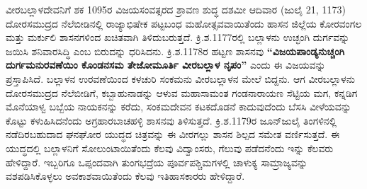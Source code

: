 ವೀರಬಲ್ಲಾಳದೇವನಿಗೆ ಶಕ 1095ರ ವಿಜಯಸಂವತ್ಸರದ ಶ್ರಾವಣ ಶುದ್ಧ ದಶಮೀ ಆದಿವಾರ (ಜುಲೈ 21, 1173) ದೋರಸಮುದ್ರದ ನೆಲೆಬೀಡಿನಲ್ಲಿ ರಾಜ್ಯಾಭಿಷೇಕ ಪಟ್ಟಬಂಧ ಮಹೋತ್ಸವವಾಯಿತೆಂದು ಹಾಸನ ಜಿಲ್ಲೆಯ ಕೋರವಂಗಲ ಮತ್ತು ಮರ್ಕುಲಿ ಶಾಸನಗಳಿಂದ ಖಚಿತವಾಗಿ ತಿಳಿದುಬರುತ್ತದೆ. ಕ್ರಿ.ಶ.1177ರಲ್ಲಿ ಬಲ್ಲಾಳನು ಉಚ್ಛಂಗಿ ದುರ್ಗವನ್ನು ಜಯಿಸಿ ಶನಿವಾರಸಿದ್ಧಿ ಎಂಬ ಬಿರುದನ್ನು ಧರಿಸಿದನು. ಕ್ರಿ.ಶ.1178ರ ಹಟ್ಟಣ ಶಾಸನವು \textbf{“ವಿಜಯಪಾಂಡ್ಯನುಚ್ಚಂಗಿ ದುರ್ಗಮನುರವಣೆಯಿಂ ಕೊಂಡನಸಮ ತೇಜೋಮೂರ್ತಿ ವೀರಬಲ್ಲಾಳ ನೃಪಂ”} ಎಂದು ಈ ವಿಜಯವನ್ನು ಪ್ರಸ್ತಾಪಿಸಿದೆ. ಬಲ್ಲಾಳನ ಉರವಣೆಯಿಂದ ಕಳಚುರಿ ಸಂಕಮನು ವೀರಬಲ್ಲಾಳನ ಮೇಲೆ ಬಿದ್ದನು. ಆಗ ವೀರಬಲ್ಲಾಳನು ದೋರಸಮುದ್ರದ ನೆಲೆಬೀಡಿಗೆ, ಕಬ್ಬಾಹುನಾಡನ್ನು ಆಳುವ ಮಹಾಸಾಮಂತ ಗಂಡನಾರಾಯಣ ಸೆಟ್ಟಿಯ ಮಗ, ಕನ್ನಡಿಗ ಮೊನೆಯಾಳ್ವ ಬಬ್ಬೆಯ ನಾಯಕನನ್ನು ಕರೆದು, ಸಂಕಮದೇವನ ಕಟಕದೊಡನೆ ಕಾದುವುದೆಂದು ಬೆಸಸಿ ವೀಳೆಯವನ್ನು ಕೊಟ್ಟು ಕಳುಹಿಸಿದನೆಂದು ಅಗ್ರಹಾರಬಾಚಹಳ್ಳಿ ಶಾಸನವು ತಿಳಿಸುತ್ತದೆ. ಕ್ರಿ.ಶ.1179ರ ಜೂನ್​\enginline{-}ಜುಲೈ ತಿಂಗಳಿನಲ್ಲಿ ನಡೆದಿರಬಹುದಾದ ಘನಘೋರ ಯುದ್ಧದ ಚಿತ್ರವನ್ನು ಈ ವೀರಗಲ್ಲು ಶಾಸನ ಶಿಲ್ಪದ ಸಮೇತ ವರ್ಣಿಸುತ್ತದೆ. ಈ ಯುದ್ಧದಲ್ಲಿ ಬಲ್ಲಾಳನಿಗೆ ಸೋಲುಂಟಾಯಿ\-ತೆಂದು ಕೆಲವು ವಿದ್ವಾಂಸರು, ಗೆಲುವು ಪಡೆದನೆಂದು ಇನ್ನು ಕೆಲವರು ಹೇಳಿದ್ದಾರೆ. ಇಬ್ಬರಿಗೂ ಒಪ್ಪಂದವಾಗಿ ತುಂಗಭದ್ರೆಯ ಪೂರ್ವಪಶ್ಚಿಮಗಳಲ್ಲಿ ಚಾಳುಕ್ಯ ಸಾಮ್ರಾಜ್ಯವನ್ನು ವಶಪಡಿಸಿಕೊಳ್ಳಲು ಅವಕಾಶವಾಯಿತೆಂದು ಕೆಲವು ಇತಿಹಾಸ\-ಕಾರರು ಹೇಳಿದ್ದಾರೆ.

